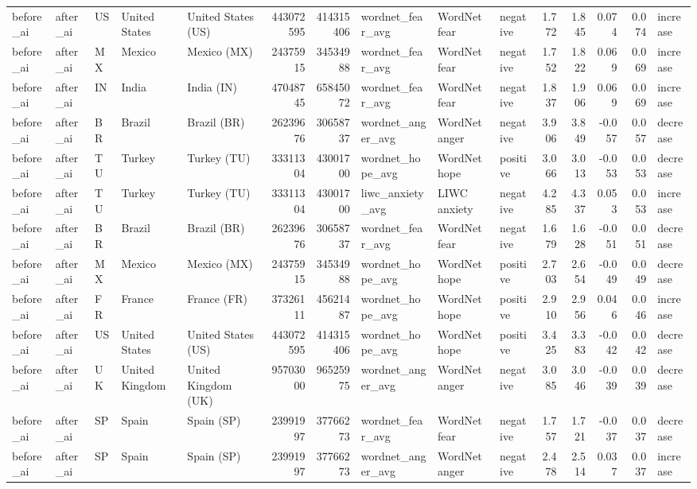 \begin{tabular}{lllllrrlllrrrrl}
before\_ai & after\_ai & US & United States & United States (US) & 443072595 & 414315406 & wordnet\_fear\_avg & WordNet fear & negative & 1.772 & 1.845 & 0.074 & 0.074 & increase \\
before\_ai & after\_ai & MX & Mexico & Mexico (MX) & 24375915 & 34534988 & wordnet\_fear\_avg & WordNet fear & negative & 1.752 & 1.822 & 0.069 & 0.069 & increase \\
before\_ai & after\_ai & IN & India & India (IN) & 47048745 & 65845072 & wordnet\_fear\_avg & WordNet fear & negative & 1.837 & 1.906 & 0.069 & 0.069 & increase \\
before\_ai & after\_ai & BR & Brazil & Brazil (BR) & 26239676 & 30658737 & wordnet\_anger\_avg & WordNet anger & negative & 3.906 & 3.849 & -0.057 & 0.057 & decrease \\
before\_ai & after\_ai & TU & Turkey & Turkey (TU) & 33311304 & 43001700 & wordnet\_hope\_avg & WordNet hope & positive & 3.066 & 3.013 & -0.053 & 0.053 & decrease \\
before\_ai & after\_ai & TU & Turkey & Turkey (TU) & 33311304 & 43001700 & liwc\_anxiety\_avg & LIWC anxiety & negative & 4.285 & 4.337 & 0.053 & 0.053 & increase \\
before\_ai & after\_ai & BR & Brazil & Brazil (BR) & 26239676 & 30658737 & wordnet\_fear\_avg & WordNet fear & negative & 1.679 & 1.628 & -0.051 & 0.051 & decrease \\
before\_ai & after\_ai & MX & Mexico & Mexico (MX) & 24375915 & 34534988 & wordnet\_hope\_avg & WordNet hope & positive & 2.703 & 2.654 & -0.049 & 0.049 & decrease \\
before\_ai & after\_ai & FR & France & France (FR) & 37326111 & 45621487 & wordnet\_hope\_avg & WordNet hope & positive & 2.910 & 2.956 & 0.046 & 0.046 & increase \\
before\_ai & after\_ai & US & United States & United States (US) & 443072595 & 414315406 & wordnet\_hope\_avg & WordNet hope & positive & 3.425 & 3.383 & -0.042 & 0.042 & decrease \\
before\_ai & after\_ai & UK & United Kingdom & United Kingdom (UK) & 95703000 & 96525975 & wordnet\_anger\_avg & WordNet anger & negative & 3.085 & 3.046 & -0.039 & 0.039 & decrease \\
before\_ai & after\_ai & SP & Spain & Spain (SP) & 23991997 & 37766273 & wordnet\_fear\_avg & WordNet fear & negative & 1.757 & 1.721 & -0.037 & 0.037 & decrease \\
before\_ai & after\_ai & SP & Spain & Spain (SP) & 23991997 & 37766273 & wordnet\_anger\_avg & WordNet anger & negative & 2.478 & 2.514 & 0.037 & 0.037 & increase \\

\end{tabular}
